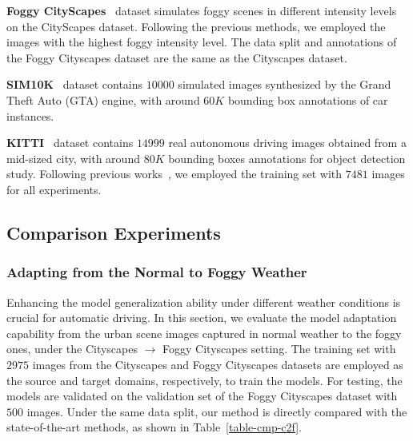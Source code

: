 \documentclass[journal]{IEEEtran}
\begin{document}
\textbf{Foggy CityScapes}~\cite{sakaridis2018semantic} dataset simulates foggy scenes in different intensity levels on the CityScapes dataset. Following the previous methods, we employed the images with the highest foggy intensity level. The data split and annotations of the Foggy Cityscapes dataset are the same as the Cityscapes dataset. 


\textbf{SIM10K}~\cite{johnson2016driving} dataset contains $10000$ simulated images synthesized by the Grand Theft Auto (GTA) engine, with around $60K$ bounding box annotations of car instances. 

\textbf{KITTI}~\cite{geiger2012we} dataset contains $14999$ real autonomous driving images obtained from a mid-sized city, with around $80K$ bounding boxes annotations for object detection study. Following previous works~\cite{chen2018domain,he2019multi,he2020domain}, we employed the training set with $7481$ images for all experiments.



\subsection{Comparison Experiments}



\subsubsection{Adapting from the Normal to Foggy Weather}

Enhancing the model generalization ability under different weather conditions is crucial for automatic driving. In this section, we evaluate the model adaptation capability from the urban scene images captured in normal weather to the foggy ones, under the Cityscapes $\to$ Foggy Cityscapes setting. The training set with $2975$ images from the Cityscapes and Foggy Cityscapes datasets are employed as the source and target domains, respectively, to train the models. For testing, the models are validated on the validation set of the Foggy Cityscapes dataset with $500$ images. Under the same data split, our method is directly compared with the state-of-the-art methods, as shown in Table~\ref{table-cmp-c2f}. {}
\end{document}
